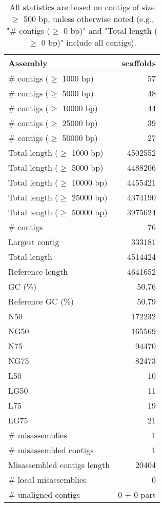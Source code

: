 \documentclass[12pt,a4paper]{article}
\begin{document}
\begin{table}[ht]
\begin{center}
\caption{All statistics are based on contigs of size $\geq$ 500 bp, unless otherwise noted (e.g., "\# contigs ($\geq$ 0 bp)" and "Total length ($\geq$ 0 bp)" include all contigs).}
\begin{tabular}{|l*{1}{|r}|}
\hline
Assembly & scaffolds \\ \hline
\# contigs ($\geq$ 1000 bp) & 57 \\ \hline
\# contigs ($\geq$ 5000 bp) & 48 \\ \hline
\# contigs ($\geq$ 10000 bp) & 44 \\ \hline
\# contigs ($\geq$ 25000 bp) & 39 \\ \hline
\# contigs ($\geq$ 50000 bp) & 27 \\ \hline
Total length ($\geq$ 1000 bp) & 4502552 \\ \hline
Total length ($\geq$ 5000 bp) & 4488206 \\ \hline
Total length ($\geq$ 10000 bp) & 4455421 \\ \hline
Total length ($\geq$ 25000 bp) & 4374190 \\ \hline
Total length ($\geq$ 50000 bp) & 3975624 \\ \hline
\# contigs & 76 \\ \hline
Largest contig & 333181 \\ \hline
Total length & 4514424 \\ \hline
Reference length & 4641652 \\ \hline
GC (\%) & 50.76 \\ \hline
Reference GC (\%) & 50.79 \\ \hline
N50 & 172232 \\ \hline
NG50 & 165569 \\ \hline
N75 & 94470 \\ \hline
NG75 & 82473 \\ \hline
L50 & 10 \\ \hline
LG50 & 11 \\ \hline
L75 & 19 \\ \hline
LG75 & 21 \\ \hline
\# misassemblies & 1 \\ \hline
\# misassembled contigs & 1 \\ \hline
Misassembled contigs length & 20404 \\ \hline
\# local misassemblies & 0 \\ \hline
\# unaligned contigs & 0 + 0 part \\ \hline

\end{tabular}
\end{center}
\end{table}
\end{document}
